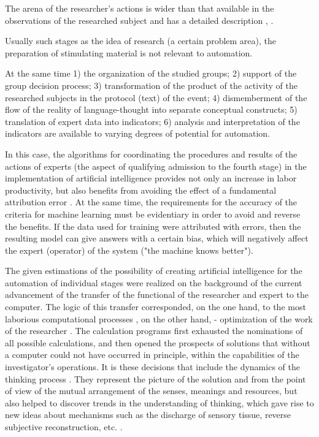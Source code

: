 \documentclass[conference]{IEEEtran}
\begin{document}
	The arena of the researcher's actions is wider than that available in the observations of the researched subject and has a detailed description \cite[118--120]{b16}, \cite[149--150]{b15}.
	
	Usually such stages as the idea of research (a certain problem area), the preparation of stimulating material is not relevant to automation.
	
	At the same time 1) the organization of the studied groups; 2) support of the group decision process; 3) transformation of the product of the activity of the researched subjects in the protocol (text) of the event; 4) dismemberment of the flow of the reality of language-thought into separate conceptual constructs; 5) translation of expert data into indicators; 6) analysis and interpretation of the indicators are available to varying degrees of potential for automation.
	
	In this case, the algorithms for coordinating the procedures and results of the actions of experts (the aspect of qualifying admission to the fourth stage) in the implementation of artificial intelligence provides not only an increase in labor productivity, but also benefits from avoiding the effect of a fundamental attribution error \cite{b21}. At the same time, the requirements for the accuracy of the criteria for machine learning must be evidentiary in order to avoid and reverse the benefits. If the data used for training were attributed with errors, then the resulting model can give answers with a certain bias, which will negatively affect the expert (operator) of the system ("the machine knows better").
	
	The given estimations of the possibility of creating artificial intelligence for the automation of individual stages were realized on the background of the current advancement of the transfer of the functional of the researcher and expert to the computer. \cite{b5,b9,b3,b10,b1,b7,b14} The logic of this transfer corresponded, on the one hand, to the most laborious computational processes \cite{b5,b9,b3,b10,b1}, on the other hand, - optimization of the work of the researcher \cite{b7,b14}. The calculation programs first exhausted the nominations of all possible calculations, and then opened the prospects of solutions that without a computer could not have occurred in principle, within the capabilities of the investigator's operations. It is these decisions that include the dynamics of the thinking process \cite{b5}. They represent the picture of the solution and from the point of view of the mutual arrangement of the senses, meanings and resources, but also helped to discover trends in the understanding of thinking, which gave rise to new ideas about mechanisms such as the discharge of sensory tissue, reverse subjective reconstruction, etc. \cite[123]{b15}.
	
\end{document}
